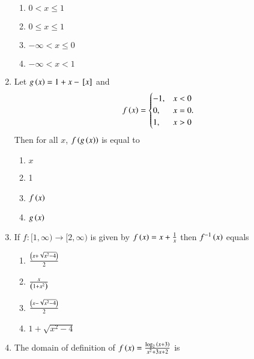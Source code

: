 \documentclass[journal,12pt,twocolumn]{IEEEtran}
\theoremstyle{remark}
\begin{document}
\begin{enumerate}
\hfill{}

\begin{multicols}{2}
	\begin{enumerate}
		\item $0<x\le1$ 
		\item $0\le x\le1$
		\item $-\infty<x\le0$ 
		\item $-\infty<x<1$
	\end{enumerate}
\end{multicols}

\item Let $g\left(x\right)=1+x-{}\left[x\right]$ and
\begin{equation}
f\left(x\right)=
\begin{cases}
-1, & \text{$x<0$} \\
0, & \text{$x=0$.} \\
1, & \text{$x>0$}
\end{cases}
\end{equation}
Then for all $x$, $f\left(g\left(x\right)\right)$ is equal to

\hfill{}

\begin{multicols}{2}
	\begin{enumerate}
		\item $x$ 
		\item 1
		\item $f\left(x\right)$ 
		\item $g\left(x\right)$
	\end{enumerate}
\end{multicols}

\item If $f:[1,\infty)\to[2,\infty)$ is given by $f\left(x\right)=x+\frac{1}{x}$ then $f^{-1}\left(x\right)$ equals

\hfill{}

\begin{multicols}{2}
	\begin{enumerate}
		\item $\frac{\left(x+\sqrt{x^{2}-4}\right)}{2}$ 
		\item $\frac{x}{\left(1+x^{2}\right)}$
		\item $\frac{\left(x-\sqrt{x^{2}-4}\right)}{2}$ 
		\item $1+\sqrt{x^{2}-4}$
	\end{enumerate}
\end{multicols}

\item The domain of definition of $f\left(x\right)=\frac{\log_{2}{\left(x+3\right)}}{x^{2}+3x+2}$ is


\end{enumerate}
\end{document}
